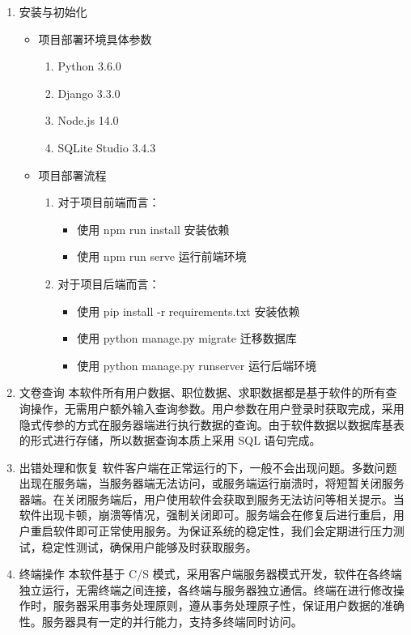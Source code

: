 \documentclass[UTF8,a4paper,10pt]{ctexart}
\begin{document}
    \begin{enumerate}
        \item 安装与初始化
        \begin{itemize}
            \item 项目部署环境具体参数
            \begin{enumerate}[label=(\alph*)]
                \item Python 3.6.0
                \item Django 3.3.0
                \item Node.js 14.0
                \item SQLite Studio 3.4.3
            \end{enumerate}
            \item 项目部署流程
            \begin{enumerate}[label=(\roman*)]
                \item 对于项目前端而言：
                \begin{itemize}
                    \item 使用 npm run install 安装依赖
                    \item 使用 npm run serve 运行前端环境
                \end{itemize}
                \item 对于项目后端而言：
                \begin{itemize}
                    \item 使用 pip install -r requirements.txt 安装依赖
                    \item 使用 python manage.py migrate 迁移数据库
                    \item 使用 python manage.py runserver 运行后端环境
                \end{itemize}
            \end{enumerate}
        \end{itemize}
        
        \item 文卷查询
        本软件所有用户数据、职位数据、求职数据都是基于软件的所有查询操作，无需用户额外输入查询参数。用户参数在用户登录时获取完成，采用隐式传参的方式在服务器端进行执行数据的查询。由于软件数据以数据库基表的形式进行存储，所以数据查询本质上采用 SQL 语句完成。
        
        \item 出错处理和恢复
        软件客户端在正常运行的下，一般不会出现问题。多数问题出现在服务端，当服务器端无法访问，或服务端运行崩溃时，将短暂关闭服务器端。在关闭服务端后，用户使用软件会获取到服务无法访问等相关提示。当软件出现卡顿，崩溃等情况，强制关闭即可。服务端会在修复后进行重启，用户重启软件即可正常使用服务。为保证系统的稳定性，我们会定期进行压力测试，稳定性测试，确保用户能够及时获取服务。
        
        \item 终端操作
        本软件基于 C/S 模式，采用客户端服务器模式开发，软件在各终端独立运行，无需终端之间连接，各终端与服务器独立通信。终端在进行修改操作时，服务器采用事务处理原则，遵从事务处理原子性，保证用户数据的准确性。服务器具有一定的并行能力，支持多终端同时访问。
    \end{enumerate}
    
\end{document}
